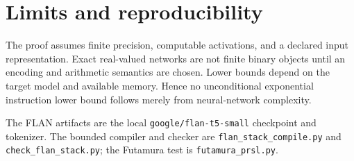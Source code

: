 \documentclass[11pt]{article}
\begin{document}
\section{Limits and reproducibility}
The proof assumes finite precision, computable activations, and a declared input representation. Exact real-valued networks are not finite binary objects until an encoding and arithmetic semantics are chosen. Lower bounds depend on the target model and available memory. Hence no unconditional exponential instruction lower bound follows merely from neural-network complexity.

The FLAN artifacts are the local \texttt{google/flan-t5-small} checkpoint and tokenizer. The bounded compiler and checker are \texttt{flan\_stack\_compile.py} and \texttt{check\_flan\_stack.py}; the Futamura test is \texttt{futamura\_prsl.py}.
\end{document}
